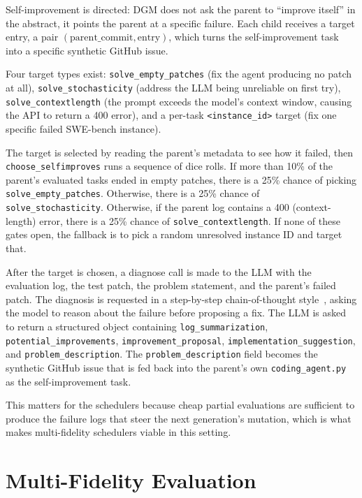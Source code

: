 Self-improvement is directed: DGM does not ask the parent to ``improve
itself'' in the abstract, it points the parent at a specific failure.
Each child receives a target entry, a pair
$(\mathrm{parent\_commit}, \mathrm{entry})$, which turns the
self-improvement task into a specific synthetic GitHub issue.

Four target types exist: \texttt{solve\_empty\_patches} (fix the agent
producing no patch at all), \texttt{solve\_stochasticity} (address the
LLM being unreliable on first try), \texttt{solve\_contextlength} (the
prompt exceeds the model's context window, causing the API to return a
400 error), and a
per-task \texttt{<instance\_id>} target (fix one specific failed
SWE-bench instance).

The target is selected by reading the parent's metadata to see how it
failed, then \texttt{choose\_selfimproves} runs a sequence of dice
rolls. If more than 10\% of the parent's evaluated tasks ended in empty
patches, there is a 25\% chance of picking
\texttt{solve\_empty\_patches}. Otherwise, there is a 25\% chance of
\texttt{solve\_stochasticity}. Otherwise, if the parent log contains a
400 (context-length) error, there is a 25\% chance of
\texttt{solve\_contextlength}. If none of these gates open, the
fallback is to pick a random unresolved instance ID and target that.

After the target is chosen, a diagnose call is made to the LLM with
the evaluation log, the test patch, the problem statement, and the
parent's failed patch. The diagnosis is requested in a step-by-step
chain-of-thought style~\cite{Wei:22}, asking the model to reason
about the failure before proposing a fix. The LLM is asked to return
a structured object containing \texttt{log\_summarization},
\texttt{potential\_improvements}, \texttt{improvement\_proposal},
\texttt{implementation\_suggestion}, and \texttt{problem\_description}.
The \texttt{problem\_description} field becomes the synthetic GitHub
issue that is fed back into the parent's own \texttt{coding\_agent.py}
as the self-improvement task.

This matters for the schedulers because cheap partial evaluations are
sufficient to produce the failure logs that steer the next generation's
mutation, which is what makes multi-fidelity schedulers viable in this
setting.

\section{Multi-Fidelity Evaluation}
\label{sec:multifidelity}

